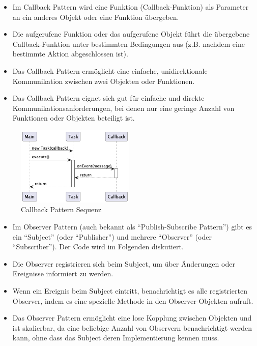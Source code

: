 \begin{itemize}
\item Im Callback Pattern wird eine Funktion (Callback-Funktion) als Parameter an ein anderes Objekt oder eine Funktion übergeben.
\item Die aufgerufene Funktion oder das aufgerufene Objekt führt die übergebene Callback-Funktion unter bestimmten Bedingungen aus (z.B. nachdem eine bestimmte Aktion abgeschlossen ist).
\item Das Callback Pattern ermöglicht eine einfache, unidirektionale Kommunikation zwischen zwei Objekten oder Funktionen.
\item Das Callback Pattern eignet sich gut für einfache und direkte Kommunikationsanforderungen, bei denen nur eine geringe Anzahl von Funktionen oder Objekten beteiligt ist.
\end{itemize}
\begin{figure}[!ht]
  \centering
  \includegraphics[width=0.50\textwidth]{fig/uml/callback-seq.png}
  \caption{Callback Pattern Sequenz}
  \label{fig:callback-seq}
\end{figure}
\begin{itemize}
\item Im Observer Pattern (auch bekannt als \enquote{Publish-Subscribe Pattern}) gibt es ein \enquote{Subject} (oder \enquote{Publisher}) und mehrere \enquote{Observer} (oder \enquote{Subscriber}). Der Code wird im Folgenden diskutiert.
\item Die Observer registrieren sich beim Subject, um über Änderungen oder Ereignisse informiert zu werden.
\item Wenn ein Ereignis beim Subject eintritt, benachrichtigt es alle registrierten Observer, indem es eine spezielle Methode in den Observer-Objekten aufruft.
\item Das Observer Pattern ermöglicht eine lose Kopplung zwischen Objekten und ist skalierbar, da eine beliebige Anzahl von Observern benachrichtigt werden kann, ohne dass das Subject deren Implementierung kennen muss.
\end{itemize}

